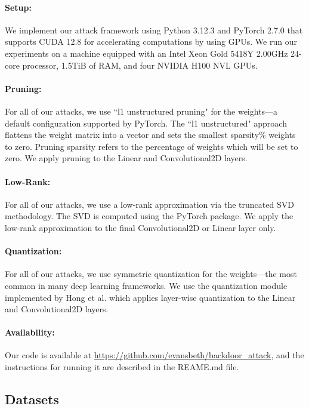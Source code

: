 \documentclass{article}
\theoremstyle{plain}
\theoremstyle{definition}
\theoremstyle{remark}
\begin{document}
\paragraph{Setup:} We implement our attack framework using Python 3.12.3 and PyTorch 2.7.0 that supports CUDA 12.8 for accelerating computations by using GPUs. We run our experiments on a machine equipped with an Intel Xeon Gold 5418Y 2.00GHz 24-core processor, 1.5TiB of RAM, and four NVIDIA H100 NVL GPUs.

\paragraph{Pruning:} For all of our attacks, we use ``l1 unstructured pruning" for the weights—a default configuration supported by PyTorch. The ``l1 unstructured" approach flattens the weight matrix into a vector and sets the smallest sparsity\% weights to zero. Pruning sparsity refers to the percentage of weights which will be set to zero. We apply pruning to the Linear and Convolutional2D layers.

\paragraph{Low-Rank:} For all of our attacks, we use a low-rank approximation via the truncated SVD methodology. The SVD is computed using the PyTorch package. We apply the low-rank approximation to the final Convolutional2D or Linear layer only.

\paragraph{Quantization:} For all of our attacks, we use symmetric quantization for the weights—the most common in many deep learning frameworks. We use the quantization module implemented by Hong et al. \cite{hong_qu-anti-zation_2021} which applies layer-wise quantization to the Linear and Convolutional2D layers.

\paragraph{Availability:} Our code is available at \url{https://github.com/evansbeth/backdoor_attack}, and the instructions for running it are described in the REAME.md file.

\subsection{Datasets}
\end{document}

